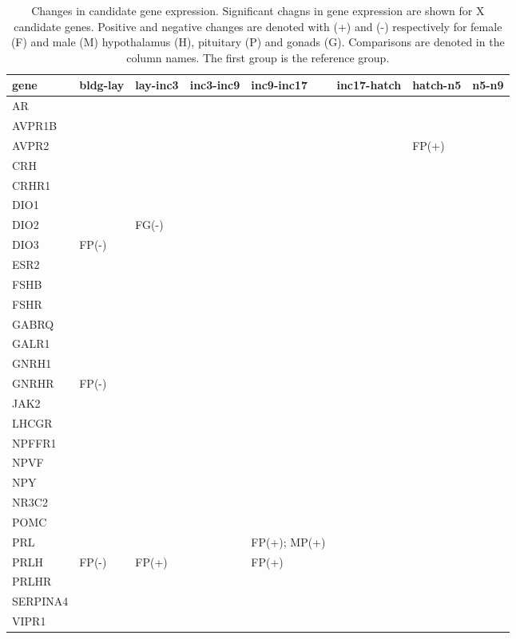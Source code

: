 \begin{Schunk}
\begin{table}
\caption{\label{tab:table1}Changes in candidate gene expression. Significant chagns in gene expression are shown for X candidate genes. Positive and negative changes are denoted with (+) and (-) respectively for female (F) and male (M) hypothalamus (H), pituitary (P) and gonads (G). Comparisons are denoted in the column names. The first group is the reference group.}
\centering
\begin{tabular}[t]{l|l|l|l|l|l|l|l}
\hline
gene & bldg-lay & lay-inc3 & inc3-inc9 & inc9-inc17 & inc17-hatch & hatch-n5 & n5-n9\\
\hline
AR &  &  &  &  &  &  & \\
\hline
AVPR1B &  &  &  &  &  &  & \\
\hline
AVPR2 &  &  &  &  &  & FP(+) & \\
\hline
CRH &  &  &  &  &  &  & \\
\hline
CRHR1 &  &  &  &  &  &  & \\
\hline
DIO1 &  &  &  &  &  &  & \\
\hline
DIO2 &  & FG(-) &  &  &  &  & \\
\hline
DIO3 & FP(-) &  &  &  &  &  & \\
\hline
ESR2 &  &  &  &  &  &  & \\
\hline
FSHB &  &  &  &  &  &  & \\
\hline
FSHR &  &  &  &  &  &  & \\
\hline
GABRQ &  &  &  &  &  &  & \\
\hline
GALR1 &  &  &  &  &  &  & \\
\hline
GNRH1 &  &  &  &  &  &  & \\
\hline
GNRHR & FP(-) &  &  &  &  &  & \\
\hline
JAK2 &  &  &  &  &  &  & \\
\hline
LHCGR &  &  &  &  &  &  & \\
\hline
NPFFR1 &  &  &  &  &  &  & \\
\hline
NPVF &  &  &  &  &  &  & \\
\hline
NPY &  &  &  &  &  &  & \\
\hline
NR3C2 &  &  &  &  &  &  & \\
\hline
POMC &  &  &  &  &  &  & \\
\hline
PRL &  &  &  & FP(+); MP(+) &  &  & \\
\hline
PRLH & FP(-) & FP(+) &  & FP(+) &  &  & \\
\hline
PRLHR &  &  &  &  &  &  & \\
\hline
SERPINA4 &  &  &  &  &  &  & \\
\hline
VIPR1 &  &  &  &  &  &  & \\
\hline
\end{tabular}
\end{table}

\end{Schunk}


